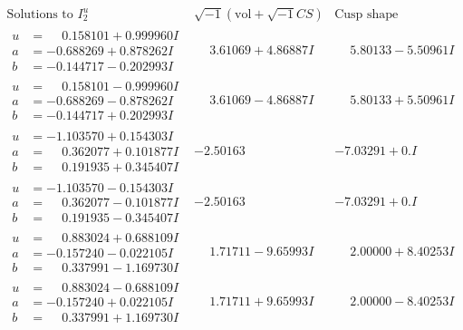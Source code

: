 \documentclass[1p]{elsarticle_modified}
\theoremstyle{definition}
\newcommand{\I}{\sqrt{-1}}
\begin{document}
$$\begin{array}{c|c|c}  
\text{Solutions to }I^u_{2}& \I (\text{vol} + \sqrt{-1}CS) & \text{Cusp shape}\\
 \hline 
\begin{aligned}
u &= \phantom{-}0.158101 + 0.999960 I \\
a &= -0.688269 + 0.878262 I \\
b &= -0.144717 - 0.202993 I\end{aligned}
 & \phantom{-}3.61069 + 4.86887 I & \phantom{-}5.80133 - 5.50961 I \\ \hline\begin{aligned}
u &= \phantom{-}0.158101 - 0.999960 I \\
a &= -0.688269 - 0.878262 I \\
b &= -0.144717 + 0.202993 I\end{aligned}
 & \phantom{-}3.61069 - 4.86887 I & \phantom{-}5.80133 + 5.50961 I \\ \hline\begin{aligned}
u &= -1.103570 + 0.154303 I \\
a &= \phantom{-}0.362077 + 0.101877 I \\
b &= \phantom{-}0.191935 + 0.345407 I\end{aligned}
 & -2.50163\phantom{ +0.000000I} & -7.03291 + 0. I\phantom{ +0.000000I} \\ \hline\begin{aligned}
u &= -1.103570 - 0.154303 I \\
a &= \phantom{-}0.362077 - 0.101877 I \\
b &= \phantom{-}0.191935 - 0.345407 I\end{aligned}
 & -2.50163\phantom{ +0.000000I} & -7.03291 + 0. I\phantom{ +0.000000I} \\ \hline\begin{aligned}
u &= \phantom{-}0.883024 + 0.688109 I \\
a &= -0.157240 - 0.022105 I \\
b &= \phantom{-}0.337991 - 1.169730 I\end{aligned}
 & \phantom{-}1.71711 - 9.65993 I & \phantom{-}2.00000 + 8.40253 I \\ \hline\begin{aligned}
u &= \phantom{-}0.883024 - 0.688109 I \\
a &= -0.157240 + 0.022105 I \\
b &= \phantom{-}0.337991 + 1.169730 I\end{aligned}
 & \phantom{-}1.71711 + 9.65993 I & \phantom{-}2.00000 - 8.40253 I \\ \hline\begin{aligned}

\end{aligned}
\end{array}$$
\end{document}

